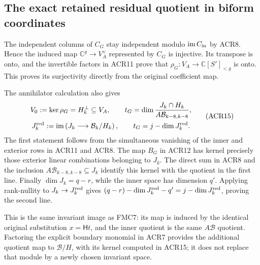\documentclass[11pt,a4paper]{article}
\begin{document}
\subsection{The exact retained residual quotient in biform coordinates}

The independent columns of $C_G$ stay independent modulo
$\operatorname{im}C_{\rm in}$ by ACR8. Hence the induced
map $\mathbb C^g\to V_A^\vee$ represented by $C_G$ is
injective. Its transpose is onto, and the invertible factors
in ACR11 prove that $\rho_G:V_A\to\mathbb C[S']_{<g}$
is onto. This proves its surjectivity directly from the
original coefficient map.

The annihilator calculation also gives
\[
 \begin{gathered}
 V_0:=\ker\rho_G=H_k^\perp\subseteq V_A,\qquad
 t_G=\dim\frac{J_k\cap H_k}{A\mathcal B_{k-8,k-8}},\\
 J_k^{\rm red}:=\operatorname{im}
       \left(J_k\longrightarrow\mathcal B_k/H_k\right),
 \qquad t_G=j-\dim J_k^{\rm red}.
 \end{gathered}\tag{ACR15}
\]
The first statement follows from the simultaneous vanishing
of the inner and exterior rows in ACR11 and ACR8. The
map $B_G$ in ACR12 has kernel precisely those exterior
linear combinations belonging to $J_k$. The direct sum in
ACR8 and the inclusion $A\mathcal B_{k-8,k-8}\subseteq J_k$
identify this kernel with the quotient in the first line.
Finally $\dim J_k=q-r$, while the inner space has
dimension $q'$. Applying rank-nullity to $J_k\to J_k^{\rm red}$
gives $(q-r)-\dim J_k^{\rm red}-q'=j-\dim J_k^{\rm red}$,
proving the second line.

This is the same invariant image as FMC7: its map is induced
by the identical original substitution $x=\mathsf Ht$,
and the inner quotient is the same $A\mathcal B$ quotient.
Factoring the explicit boundary monomial in ACR7 provides
the additional quotient map to $\mathcal B/H$, with its
kernel computed in ACR15; it does not replace that module
by a newly chosen invariant space.
\end{document}
